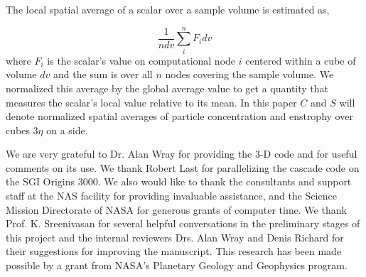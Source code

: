 \documentclass[aps,pra,twocolumn,groupedaddress,showkeys,showpacs,floatfix]{revtex4}
\begin{document}
  The local spatial average of a scalar over a sample volume is estimated as,

\begin{equation}
  \frac{1}{n dv}\sum_{i}^{n} F_i dv \label{a6}       
\end{equation}
where $F_i$ is the scalar's value on computational node $i$ centered   within a
cube of volume $dv$ and the sum   is over all $n$ nodes covering the sample
volume.  We normalized this average by the global average value to get a
quantity that measures the scalar's  local value relative to its mean.
In this paper $C$ and $S$ will denote
normalized spatial averages of particle concentration and enstrophy over
cubes $3\eta$ on a side.


\begin{acknowledgments}

We are very grateful to Dr. Alan Wray for providing the 3-D code and for   
useful comments on its use. We thank Robert Last for parallelizing the cascade
code on the SGI Origins 3000. We also would like to thank the consultants and
support staff at the NAS facility for providing invaluable assistance, and the
Science Mission Directorate of NASA for generous grants of computer time. 
We thank Prof. K. Sreenivasan for several helpful conversations in the
preliminary stages of this project and the internal reviewers Drs. Alan Wray 
and Denis Richard for their suggestions
for improving the manuscript. This research has been made possible by
a grant from NASA's Planetary Geology and Geophysics program.

\end{acknowledgments}
\end{document}
